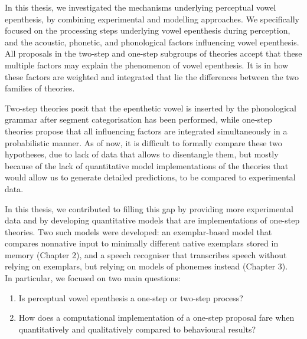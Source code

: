
In this thesis, we investigated the mechanisms underlying perceptual vowel epenthesis, by combining experimental and modelling approaches. We specifically focused on the processing steps underlying vowel epenthesis during perception, and the acoustic, phonetic, and phonological factors influencing vowel epenthesis. All proposals in the two-step and one-step subgroups of theories accept that these multiple factors may explain the phenomenon of vowel epenthesis. It is in how these factors are weighted and integrated that lie the differences between the two families of theories.

Two-step theories posit that the epenthetic vowel is inserted by the phonological grammar after segment categorisation has been performed, while one-step theories propose that all influencing factors are integrated simultaneously in a probabilistic manner. As of now, it is difficult to formally compare these two hypotheses, due to lack of data that allows to disentangle them, but mostly because of the lack of quantitative model implementations of the theories that would allow us to generate detailed predictions, to be compared to experimental data.

In this thesis, we contributed to filling this gap by providing more experimental data and by developing quantitative models that are implementations of one-step theories. Two such models were developed: an exemplar-based model that compares nonnative input to minimally different native exemplars stored in memory (Chapter 2), and a speech recogniser that transcribes speech without relying on exemplars, but relying on models of phonemes instead (Chapter 3). \\    

In particular, we focused on two main questions:
\begin{enumerate}
\item Is perceptual vowel epenthesis a one-step or two-step process?
\item How does a computational implementation of a one-step proposal fare when quantitatively and qualitatively compared to behavioural results? 
\end{enumerate}

